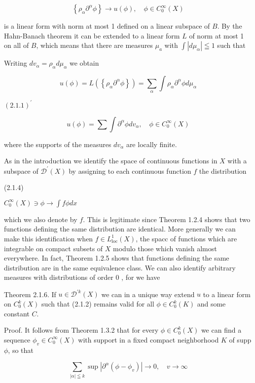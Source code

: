 \[
\left\{\rho_{\alpha} \partial^{\alpha} \phi\right\} \rightarrow u(\phi), \quad \phi \in C_{0}^{\infty}(X)
\]

is a linear form with norm at most 1 defined on a linear subspace of $B$. By the Hahn-Banach theorem it can be extended to a linear form $L$ of norm at most 1 on all of $B$, which means that there are measures $\mu_{a}$ with $\int\left|d \mu_{\alpha}\right| \leqq 1$ such that

Writing $d v_{\alpha}=\rho_{\alpha} d \mu_{\alpha}$ we obtain

\[
u(\phi)=L\left(\left\{\rho_{\alpha} \partial^{\alpha} \phi\right\}\right)=\sum_{\alpha} \int \rho_{\alpha} \partial^{\alpha} \phi d \mu_{\alpha}
\]

$(2.1 .1)^{\prime}$

\[
u(\phi)=\sum \int \partial^{\alpha} \phi d v_{\alpha}, \quad \phi \in C_{0}^{\infty}(X)
\]

where the supports of the measures $d v_{\alpha}$ are locally finite.

As in the introduction we identify the space of continuous functions in $X$ with a subspace of $\mathscr{D}^{\prime}(X)$ by assigning to each continuous function $f$ the distribution

(2.1.4)

$C_{0}^{\infty}(X) \ni \phi \rightarrow \int f \phi d x$

which we also denote by $f$. This is legitimate since Theorem 1.2.4 shows that two functions defining the same distribution are identical. More generally we can make this identification when $f \in L_{\mathrm{loc}}^{1}(X)$, the spacc of functions which are integrable on compact subsets of $X$ modulo those which vanish almost everywhere. In fact, Theorem 1.2.5 shows that functions defining the same distribution are in the same equivalence class. We can also identify arbitrary measures with distributions of order 0 , for we have

Theorem 2.1.6. If $u \in \mathscr{D}^{\prime k}(X)$ we can in a unique way extend $u$ to a linear form on $C_{0}^{k}(X)$ such that (2.1.2) remains valid for all $\phi \in C_{0}^{k}(K)$ and some constant $C$.

Proof. It follows from Theorem 1.3.2 that for every $\phi \in C_{0}^{k}(X)$ we can find a sequence $\phi_{v} \in C_{0}^{\infty}(X)$ with support in a fixed compact neighborhood $K$ of supp $\phi$, so that


\begin{equation*}
\sum_{|\alpha| \leqq k} \sup \left|\partial^{\alpha}\left(\phi-\phi_{v}\right)\right| \rightarrow 0, \quad v \rightarrow \infty \tag{2.1.5}
\end{equation*}


